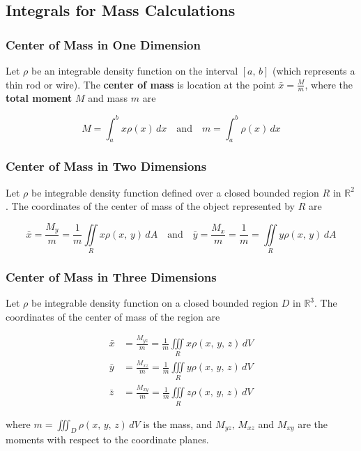 \subsection{Integrals for Mass Calculations}
\subsubsection{Center of Mass in One Dimension}
Let $\rho$ be an integrable density function on the interval $[a,\, b]$ (which represents a thin rod or wire). The \textbf{center of mass} is location at the point $\bar{x} = \frac{M}{m}$, where the \textbf{total moment} $M$ and mass $m$ are

\begin{equation}
    M = \int _a ^b x\rho(x) \, dx \quad \text{and} \quad m = \int _a ^b \rho(x)\, dx
\end{equation}

\subsubsection{Center of Mass in Two Dimensions}
Let $\rho$ be integrable density function defined over a closed bounded region $R$ in $\mathbb{R}^2$. The coordinates of the center of mass of the object represented by $R$ are

\begin{equation}
    \bar{x} = \frac{M_y}{m} = \frac{1}{m} \iint \limits _R x\rho(x,\, y)\, dA \quad \text{and} \quad \bar{y} = \frac{M_x}{m} = \frac{1}{m} = \iint \limits _R y \rho(x,\, y)\, dA
\end{equation}

\subsubsection{Center of Mass in Three Dimensions}
Let $\rho$ be integrable density function on a closed bounded region $D$ in $\mathbb{R}^3$. The coordinates of the center of mass of the region are

\begin{align}
    \bar{x} &= \frac{M_{yz}}{m} = \frac{1}{m} \iiint \limits _R x\rho(x,\, y,\, z)\, dV \\
    \bar{y} &= \frac{M_{xz}}{m} = \frac{1}{m} \iiint \limits _R y\rho(x,\, y,\, z)\, dV \\
    \bar{z} &= \frac{M_{xy}}{m} = \frac{1}{m} \iiint \limits _R z\rho(x,\, y,\, z)\, dV
\end{align}

where $m = \iiint _D \rho(x,\, y,\, z)\, dV$ is the mass, and $M_{yz},\, M_{xz}$ and $M_{xy}$ are the moments with respect to the coordinate planes.
